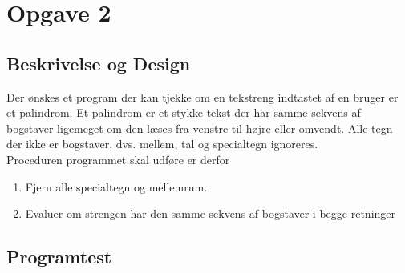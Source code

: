 \section{Opgave 2}
\subsection{Beskrivelse og Design}
	Der ønskes et program der kan tjekke om en tekstreng indtastet af en bruger er et palindrom. Et 	palindrom er et stykke tekst der har samme sekvens af bogstaver ligemeget om den læses fra 			venstre til højre eller omvendt. Alle tegn der ikke er bogstaver, dvs. mellem, tal og 				specialtegn ignoreres. \\
	Proceduren programmet skal udføre er derfor
	\begin{enumerate}
	\item Fjern alle specialtegn og mellemrum.
	\item Evaluer om strengen har den samme sekvens af bogstaver i begge retninger
	\end{enumerate}
\subsection{Programtest}